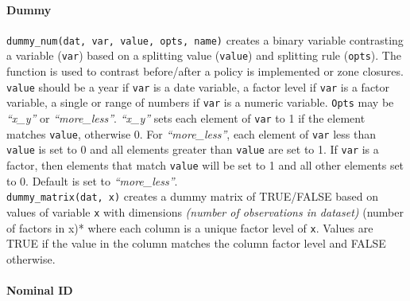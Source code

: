 \documentclass[
]{article}
\begin{document}
\hypertarget{dummy}{%
\paragraph{Dummy}\label{dummy}}

\texttt{dummy\_num(dat,\ var,\ value,\ opts,\ name)} creates a binary variable contrasting a variable (\texttt{var}) based on a splitting value (\texttt{value}) and splitting rule (\texttt{opts}). The function is used to contrast before/after a policy is implemented or zone closures. \texttt{value} should be a year if \texttt{var} is a date variable, a factor level if \texttt{var} is a factor variable, a single or range of numbers if \texttt{var} is a numeric variable. \texttt{Opts} may be \emph{``x\_y''} or \emph{``more\_less''}. \emph{``x\_y''} sets each element of \texttt{var} to 1 if the element matches \texttt{value}, otherwise 0. For \emph{``more\_less''}, each element of \texttt{var} less than \texttt{value} is set to 0 and all elements greater than \texttt{value} are set to 1. If \texttt{var} is a factor, then elements that match \texttt{value} will be set to 1 and all other elements set to 0. Default is set to \emph{``more\_less''}.\\
\texttt{dummy\_matrix(dat,\ x)} creates a dummy matrix of TRUE/FALSE based on values of variable \texttt{x} with dimensions \emph{(number of observations in dataset)} (number of factors in x)* where each column is a unique factor level of \texttt{x}. Values are TRUE if the value in the column matches the column factor level and FALSE otherwise.

\hypertarget{nominal-id}{%
\paragraph{Nominal ID}\label{nominal-id}}
\end{document}
